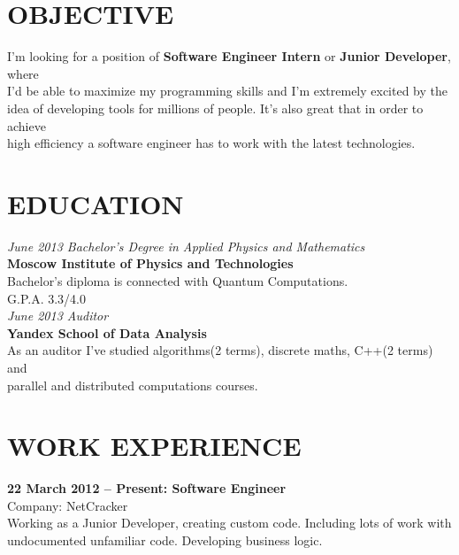 \documentclass[margin,12pt]{res}
\begin{document}
  \address{28a Pervomayskaya Street, Dolgoprudny\\
    kremsnx@gmail.com\\
    +7 (985) 964-85-12}

\begin{resume}

\section{OBJECTIVE} 
I'm looking for a position of \textbf{Software Engineer Intern} or
\textbf{Junior Developer}, where \\
I'd be able to maximize my programming skills and I'm extremely
excited by the \\
 idea of developing tools for millions of people. It's also great that
 in order to achieve \\
high efficiency a software engineer has to work with the latest technologies.\\
\section{EDUCATION} 
\textit{June 2013 Bachelor's Degree in Applied Physics and
  Mathematics\\}
\textbf{Moscow Institute of Physics and Technologies}\\
Bachelor's diploma is connected with Quantum Computations.\\
G.P.A. 3.3/4.0\\
\newline
\textit{June 2013 Auditor\\}
\textbf{Yandex School of Data Analysis}\\
As an auditor I've studied algorithms(2 terms), discrete maths, C++(2
terms) and\\
 parallel and distributed computations courses.\\
\section{WORK EXPERIENCE} 
\textbf{22 March 2012 -- Present: Software Engineer}\\
Company: NetCracker\\
Working as a Junior Developer, creating custom code. Including lots of
work with \\ 
undocumented unfamiliar code. Developing business logic.\\

\end{resume}
\end{document}
